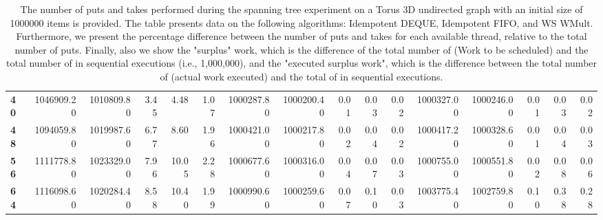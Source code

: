 \begin{table}[!ht]
{\begin{tabular}{lrrrrrrrrrrrrrrr}
\textbf{40} &       1046909.20 & 1010809.80 &           3.45 &        4.48 &                 1.07 &      1000287.80 & 1000200.40 &           0.01 &        0.03 &                 0.02 & 1000327.00 & 1000246.00 &           0.01 &        0.03 &                 0.02 \\
\textbf{48} &       1094059.80 & 1019987.60 &           6.77 &        8.60 &                 1.96 &      1000421.00 & 1000217.80 &           0.02 &        0.04 &                 0.02 & 1000417.20 & 1000328.60 &           0.01 &        0.04 &                 0.03 \\
\textbf{56} &       1111778.80 & 1023329.00 &           7.96 &       10.05 &                 2.28 &      1000677.60 & 1000316.00 &           0.04 &        0.07 &                 0.03 & 1000755.00 & 1000551.80 &           0.02 &        0.08 &                 0.06 \\
\textbf{64} &       1116098.60 & 1020284.40 &           8.58 &       10.40 &                 1.99 &      1000990.60 & 1000259.60 &           0.07 &        0.10 &                 0.03 & 1003775.40 & 1002759.80 &           0.10 &        0.38 &                 0.28 \\
\bottomrule
\end{tabular}}
\label{difference-Torus_3D_undirected-1000000-IDEMPOTENT_DEQUE-IDEMPOTENT_FIFO-WS_NC_MULT_OPT}
\caption{The number of puts and takes performed during the
    spanning tree experiment on a Torus 3D undirected graph with an initial size
    of 1000000 items is provided. The table presents data on the
    following algorithms: Idempotent DEQUE, Idempotent FIFO, and
    WS WMult. Furthermore, we present the percentage difference
    between the number of puts and takes for each available thread,
    relative to the total number of puts. Finally, also we show the
    "surplus" work, which is the difference of the total number of
    \Puts (Work to be scheduled) and the total number of \Puts in
    sequential executions (i.e., 1,000,000), and the "executed surplus
    work", which is the difference between the total number of \Takes
    (actual work executed) and the total of \Takes in sequential
    executions.}
\end{table}
